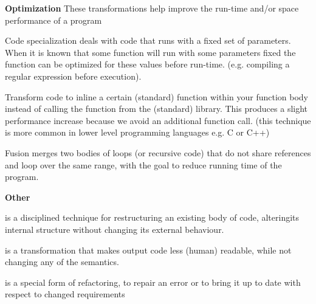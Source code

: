 \textbf{Optimization}
These transformations help improve the run-time and/or space performance of a program                                                                                        

\begin{description}[font=\normalfont,align=right,leftmargin=!, labelwidth=\widthof{{\bfseries Specialization}},labelsep=2em]
	\item[Specialization] Code specialization deals with code that runs with a fixed set of parameters. When it is known that some function will run with some parameters fixed the function can be optimized for these values before run-time. (e.g. compiling a regular expression before execution).                                                                                                                                                                              
	\item[Inlining] Transform code to inline a certain (standard) function within your function body instead of calling the function from the (standard) library. This produces a slight performance increase because we avoid an additional function call. (this technique is more common in lower level programming languages e.g. C or C++)                                                                                                                                                                             
	\item[Fusion] Fusion merges two bodies of loops (or recursive code) that do not share references and loop over the same range, with the goal to reduce running time of the program.                                                                                                                                                                              
\end{description}

\textbf{Other}

\begin{description}[font=\normalfont,align=right,leftmargin=!, labelwidth=\widthof{{\bfseries Specialization}},labelsep=2em]
	\item[Refactoring] is a disciplined technique for restructuring an existing body of code, alteringits internal structure without changing its external behaviour.\footnotemark   
	\item[Obfuscation] is a transformation that makes output code less (human) readable, while not changing any of the semantics.
	\item[Renovation] is a special form of refactoring, to repair an error or to bring it up to date with respect to changed requirements~\cite{Visser2001}
\end{description}

